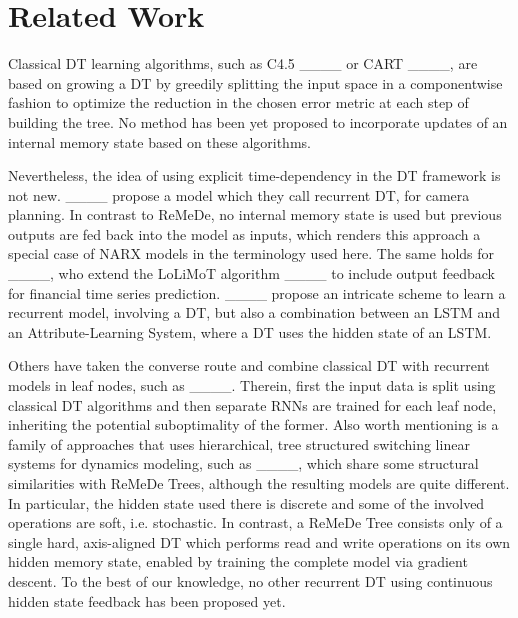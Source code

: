\section{Related Work}
Classical DT learning algorithms, such as C4.5 ____ or CART ____, are based on growing a DT by greedily splitting the input space
in a componentwise fashion to optimize the reduction in the chosen error metric at each step of building the tree.
No method has been yet proposed to incorporate updates of an internal memory state based on these algorithms.

Nevertheless, the idea of using explicit time-dependency in the DT framework is not new.
____ propose a model which they call recurrent DT, for camera planning. In contrast to ReMeDe, no internal memory state is used but previous outputs are fed back into the model as inputs, which renders this approach a special case of NARX models in the terminology used here. 
The same holds for ____, who extend the LoLiMoT algorithm ____ to include output feedback for financial time series prediction.
____ propose an intricate scheme to learn a recurrent model, involving a DT, but also a combination between an LSTM and an Attribute-Learning System, where a DT uses the hidden state of an LSTM. 

Others have taken the converse route and combine classical DT with recurrent models in leaf nodes, such as ____. Therein, first the input data is split using classical DT algorithms and then separate RNNs are trained for each leaf node, inheriting the potential suboptimality of the former.
Also worth mentioning is a family of approaches that uses hierarchical, tree structured switching linear systems for dynamics modeling, such as ____, which share some structural similarities with ReMeDe Trees, although the resulting models are quite different. In particular, the hidden state used there is discrete and some of the involved operations are soft, i.e. stochastic.
In contrast, a ReMeDe Tree consists only of a single hard, axis-aligned DT which performs read and write operations on its own hidden memory state, enabled by training the complete model via gradient descent. To the best of our knowledge, no other recurrent DT using continuous hidden state feedback has been proposed yet.